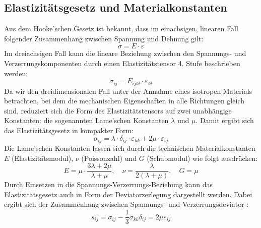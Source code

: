 \subsection{Elastizitätsgesetz und Materialkonstanten}
Aus dem Hooke’schen Gesetz ist bekannt, dass im einachsigen, linearen Fall folgender Zusammenhang zwischen Spannung und Dehnung gilt:
	\begin{equation}
		\sigma = 
		E \cdot \varepsilon
	\end{equation}
Im dreiachsigen Fall kann die lineare Beziehung zwischen den Spannungs- und Verzerrungskomponenten durch einen Elastizitätstensor 4. Stufe beschrieben werden:
	\begin{equation}
		\sigma_{ij} = 
		E_{ijkl} \cdot \varepsilon_{kl}
	\end{equation}
Da wir den dreidimensionalen Fall unter der Annahme eines isotropen Materials betrachten, bei dem die mechanischen Eigenschaften in alle Richtungen gleich sind, reduziert sich die Form des Elastizitätstensors auf zwei unabhängige Konstanten: die sogenannten Lame’schen Konstanten $\lambda$ und $\mu$. 
Damit ergibt sich das Elastizitätsgesetz in kompakter Form:
	\begin{equation}
		\sigma_{ij} = 
		\lambda \cdot \delta_{ij} \cdot \varepsilon_{kk} + 2\mu \cdot \varepsilon_{ij}
	\end{equation}
Die Lame’schen Konstanten lassen sich durch die technischen Materialkonstanten $E$ (Elastizitätsmodul), $\nu$ (Poissonzahl) und $G$ (Schubmodul) wie folgt ausdrücken:
	\begin{equation}
		E = 
		\mu \cdot \frac{3\lambda + 2\mu}{\lambda + \mu}, \quad 
		\nu = 
		\frac{\lambda}{2(\lambda + \mu)}, \quad 
		G = 
		\mu
	\end{equation}
Durch Einsetzen in die Spannungs-Verzerrungs-Beziehung kann das Elastizitätsgesetz auch in Form der Deviatorzerlegung dargestellt werden. 
Dabei ergibt sich der Zusammenhang zwischen Spannungs- und Verzerrungsdeviator \cite{elastomechanik:Grundlagen_der_Elastizitaetstheorie}:
	\begin{equation}
		s_{ij} = 
		\sigma_{ij} - \frac{1}{3} \sigma_{kk} \delta_{ij} = 
		2\mu e_{ij}
	\end{equation}
